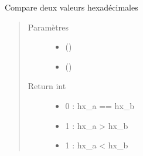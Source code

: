 \documentclass[letterpaper,10pt,french]{sphinxmanual}
\begin{document}

\begin{fulllineitems}
\label{\detokenize{modules/tools:toolbox.tools.comphex}}
Compare deux valeurs  hexadécimales
\begin{quote}\begin{description}
\item[{Paramètres}] \leavevmode\begin{itemize}
\item {} 
 () \textendash{} 

\item {} 
 () \textendash{} 

\end{itemize}

\item[{Return int}] \leavevmode\begin{itemize}
\item {} 
0 : hx\_a == hx\_b

\item {} 
1 : hx\_a \textgreater{} hx\_b

\item {} 
\sphinxhyphen{}1 : hx\_a \textless{} hx\_b

\end{itemize}

\end{description}\end{quote}

\end{fulllineitems}

\end{document}
